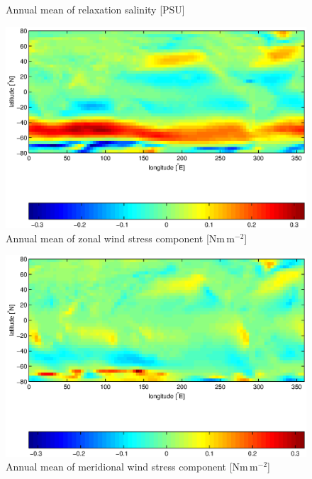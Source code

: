 {\begin{figure}[t]
\begin{center}
    \caption{Annual mean of relaxation salinity [PSU]}
    \label{fig:sim_config_sclim_pcoord}
  \end{center}
\end{figure}
\begin{figure}[t]
  \begin{center}
    \includegraphics[width=.9\textwidth]{s_examples/global_oce_in_p/tx}    
    \caption{Annual mean of zonal wind stress component [Nm\,m$^{-2}$]}
    \label{fig:sim_config_taux_pcoord}
  \end{center}
\end{figure}
\begin{figure}[t]
  \begin{center}
    \includegraphics[width=.9\textwidth]{s_examples/global_oce_in_p/ty}
    \caption{Annual mean of meridional wind stress component [Nm\,m$^{-2}$]}
    \label{fig:sim_config_tauy_pcoord}
  \end{center}
\end{figure}
\begin{figure}[t]

\end{figure}}
